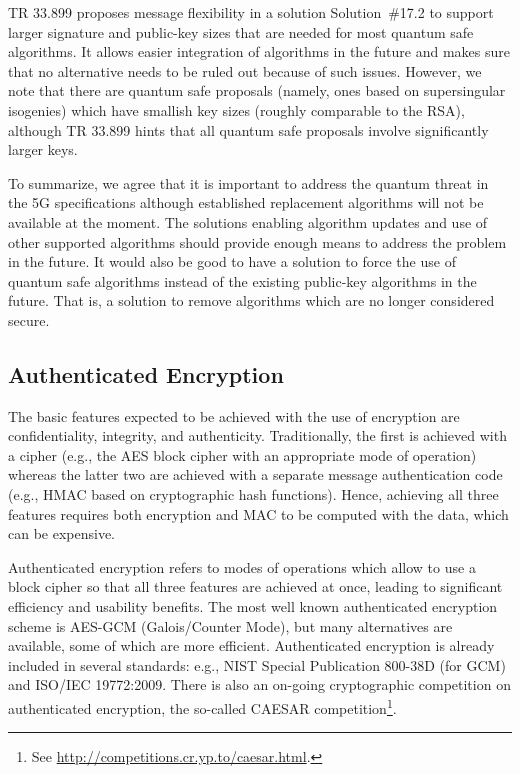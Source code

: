 \documentclass[12pt]{llncs}
\begin{document}
TR 33.899 proposes message flexibility in a solution Solution~\#17.2 to support larger signature and public-key sizes that are needed for most quantum safe algorithms. It allows easier integration of algorithms in the future and makes sure that no alternative needs to be ruled out because of such issues. However, we note that there are quantum safe proposals (namely, ones based on supersingular isogenies) which have smallish key sizes (roughly comparable to the RSA), although TR 33.899 hints that all quantum safe proposals involve significantly larger keys.

To summarize, we agree that it is important to address the quantum threat in the 5G specifications although established replacement algorithms will not be available at the moment. The solutions enabling algorithm updates and use of other supported algorithms should provide enough means to address the problem in the future. It would also be good to have a solution to force the use of quantum safe algorithms instead of the existing public-key algorithms in the future. That is, a solution to remove algorithms which are no longer considered secure.


\subsection{Authenticated Encryption}
\label{sec:ae}

The basic features expected to be achieved with the use of encryption are confidentiality, integrity, and authenticity. Traditionally, the first is achieved with a cipher (e.g., the AES block cipher with an appropriate mode of operation) whereas the latter two are achieved with a separate message authentication code (e.g., HMAC based on cryptographic hash functions). Hence, achieving all three features requires both encryption and MAC to be computed with the data, which can be expensive. 

Authenticated encryption refers to modes of operations which allow to use a block cipher so that all three features are achieved at once, leading to significant efficiency and usability benefits. The most well known authenticated encryption scheme is AES-GCM (Galois/Counter Mode), but many alternatives are available, some of which are more efficient. Authenticated encryption is already included in several standards: e.g., NIST Special Publication 800-38D (for GCM) and ISO/IEC 19772:2009. There is also an on-going cryptographic competition on authenticated encryption, the so-called CAESAR competition\footnote{See \url{http://competitions.cr.yp.to/caesar.html}.}. 
\end{document}
